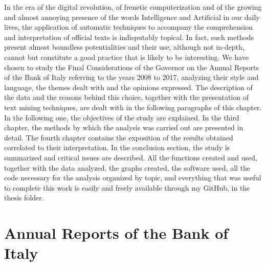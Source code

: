 \documentclass[
]{book}
\begin{document}
In the era of the digital revolution, of frenetic computerization and of the growing and almost annoying presence of the words Intelligence and Artificial in our daily lives, the application of automatic techniques to accompany the comprehension and interpretation of official texts is indisputably topical. In fact, such methods present almost boundless potentialities and their use, although not in-depth, cannot but constitute a good practice that is likely to be interesting.
We have chosen to study the Final Considerations of the Governor on the Annual Reports of the Bank of Italy referring to the years 2008 to 2017, analyzing their style and language, the themes dealt with and the opinions expressed. The description of the data and the reasons behind this choice, together with the presentation of text mining techniques, are dealt with in the following paragraphs of this chapter. In the following one, the objectives of the study are explained. In the third chapter, the methods by which the analysis was carried out are presented in detail. The fourth chapter contains the exposition of the results obtained correlated to their interpretation. In the conclusion section, the study is summarized and critical issues are described.
All the functions created and used, together with the data analyzed, the graphs created, the software used, all the code necessary for the analysis organized by topic, and everything that was useful to complete this work is easily and freely available through my GitHub, in the thesis folder.

\hypertarget{annual-reports-of-the-bank-of-italy}{%
\section{Annual Reports of the Bank of Italy}\label{annual-reports-of-the-bank-of-italy}}
\end{document}
